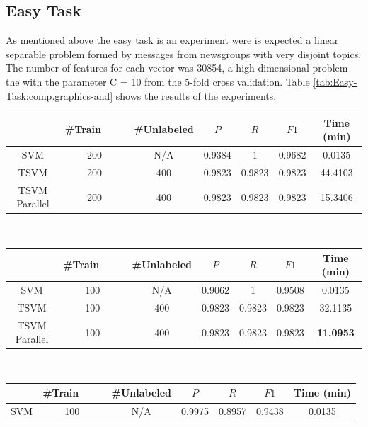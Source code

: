 \subsection{Easy Task}

As mentioned above the easy task is an experiment were is expected
a linear separable problem formed by messages from newsgroups with
very disjoint topics. The number of features for each vector was 30854,
a high dimensional problem the with the parameter C = 10 from the
5-fold cross validation. Table \ref{tab:Easy-Task:comp.graphics-and}
shows the results of the experiments. 

%
\begin{table}
\begin{longtable}
\begin{tabular}{|c|c|c|c|c|c||c|}
\hline
 & \#Train\ \ \ \ & \#Unlabeled & $P$  & $R$  & $F1$  & Time (min)\tabularnewline
\hline 
SVM & 200 & N/A & 0.9384 & 1 & 0.9682 & 0.0135\tabularnewline
\hline 
TSVM & 200 & 400 & 0.9823 & 0.9823 & 0.9823 & 44.4103\tabularnewline
\hline 
TSVM Parallel & 200 & 400 & 0.9823 & 0.9823 & 0.9823 & 15.3406\tabularnewline
\hline
\end{tabular}\\
\tabularnewline
\tabularnewline
\begin{tabular}{|c|c|c|c|c|c||c|}
\hline 
 & \#Train\ \ \ \ & \#Unlabeled & $P$  & $R$  & $F1$  & Time (min)\tabularnewline
\hline 
SVM & 100 & N/A & 0.9062 & 1 & 0.9508 & 0.0135\tabularnewline
\hline 
TSVM & 100 & 400 & 0.9823 & 0.9823 & 0.9823 & 32.1135\tabularnewline
\hline 
TSVM Parallel & 100 & 400 & 0.9823 & 0.9823 & 0.9823 & \textbf{11.0953}\tabularnewline
\hline
\end{tabular} \\
\tabularnewline
\tabularnewline
\begin{tabular}{|c|c|c|c|c|c||c|}
\hline 
 & \#Train\ \ \ \ & \#Unlabeled & $P$  & $R$  & $F1$  & Time (min)\tabularnewline
\hline
\hline 
SVM & 100 & N/A & 0.9975 & 0.8957 & 0.9438 & 0.0135\tabularnewline

\end{tabular}
\end{longtable}
\end{table}

